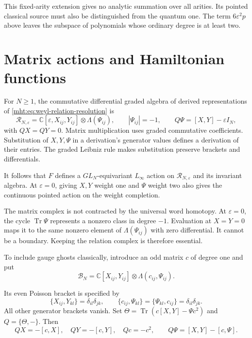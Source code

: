 This fixed-arity extension gives no analytic summation over
all arities. Its pointed classical source must
also be distinguished from the quantum one. The term
$6\varepsilon^2p$ above leaves the subspace of polynomials
whose ordinary degree is at least two.

\section{Matrix actions and Hamiltonian functions}

For $N\geq1$, the commutative differential graded algebra of
derived representations of \eqref{mht:eq:weyl-relation-resolution} is
\begin{equation}\label{mht:eq:derived-matrix-action-carrier}
 \mathcal R_{N,\varepsilon}
 =\mathbb C[\varepsilon,X_{ij},Y_{ij}]
       \otimes\Lambda(\Psi_{ij}),
 \qquad |\Psi_{ij}|=-1,
 \qquad Q\Psi=[X,Y]-\varepsilon I_N,
\end{equation}
with $QX=QY=0$. Matrix multiplication uses graded commutative
coefficients. Substitution of $X,Y,\Psi$ in a derivation's
generator values defines a derivation of their entries.
The graded Leibniz rule makes substitution preserve brackets
and differentials.

It follows that $F$ defines a $GL_N$-equivariant $L_\infty$
action on $\mathcal R_{N,\varepsilon}$ and its invariant
algebra. At $\varepsilon=0$, giving $X,Y$ weight one and
$\Psi$ weight two also gives the continuous pointed action
on the weight completion.

The matrix complex is not contracted by the universal word
homotopy. At $\varepsilon=0$, the cycle
$\operatorname{Tr}\Psi$ represents a nonzero class in degree
$-1$. Evaluation at $X=Y=0$ maps it to the same nonzero element
of $\Lambda(\Psi_{ij})$ with zero differential. It cannot be
a boundary. Keeping the relation complex is therefore essential.

To include gauge ghosts classically, introduce an odd matrix
$c$ of degree one and put
\[
 \mathcal B_N
 =\mathbb C[X_{ij},Y_{ij}]
       \otimes\Lambda(c_{ij},\Psi_{ij}).
\]

Its even Poisson bracket is specified by
\[
 \{X_{ij},Y_{kl}\}=\delta_{il}\delta_{jk},\qquad
 \{c_{ij},\Psi_{kl}\}=\{\Psi_{kl},c_{ij}\}
       =\delta_{il}\delta_{jk}.
\]
All other generator brackets vanish. Set
$\Theta=\operatorname{Tr}(c[X,Y]-\Psi c^2)$ and
$Q=\{\Theta,-\}$. Then
\begin{equation}\label{mht:eq:action-bfv-differential}
 QX=-[c,X],\quad QY=-[c,Y],\quad Qc=-c^2,
 \qquad Q\Psi=[X,Y]-[c,\Psi].
\end{equation}

